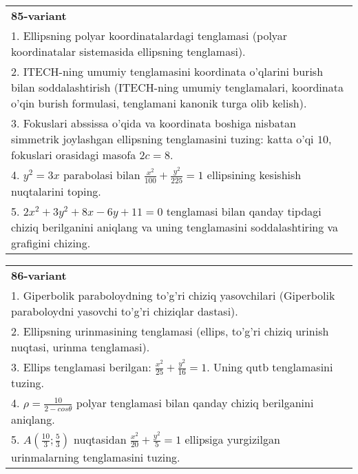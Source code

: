 \documentclass{article}
\begin{document}
\begin{tabular}{m{17cm}}
\textbf{85-variant}\\
1. Ellipsning polyar koordinatalardagi tenglamasi (polyar koordinatalar sistemasida ellipsning tenglamasi).\\

2. ITECH-ning umumiy tenglamasini koordinata o'qlarini burish bilan soddalashtirish (ITECH-ning umumiy tenglamalari, koordinata o'qin burish formulasi, tenglamani kanonik turga olib kelish).\\

3. Fokuslari abssissa o'qida va koordinata boshiga nisbatan simmetrik joylashgan ellipsning tenglamasini tuzing: katta o'qi $10$, fokuslari orasidagi masofa $2c=8$.\\

4. $y^{2} = 3x$ parabolasi bilan $\frac{x^{2}}{100} + \frac{y^{2}}{225} = 1$ ellipsining kesishish nuqtalarini toping.  \\

5. $2x^{2} + 3y^{2} + 8x - 6y + 11 = 0$ tenglamasi bilan qanday tipdagi chiziq berilganini aniqlang va uning tenglamasini soddalashtiring va grafigini chizing.  
\end{tabular}
\vspace{1cm}


\begin{tabular}{m{17cm}}
\textbf{86-variant}\\
1. Giperbolik paraboloydning to'g'ri chiziq yasovchilari (Giperbolik paraboloydni yasovchi to'g'ri chiziqlar dastasi).\\

2. Ellipsning urinmasining tenglamasi (ellips, to'g'ri chiziq urinish nuqtasi, urinma tenglamasi).\\

3. Ellips tenglamasi berilgan: $\frac{x^2}{25}+\frac{y^2}{16}=1$. Uning qutb tenglamasini tuzing.\\

4. $\rho = \frac{10}{2 - cos\theta}$ polyar tenglamasi bilan qanday chiziq berilganini aniqlang.  \\

5. $A(\frac{10}{3};\frac{5}{3})$ nuqtasidan $\frac{x^{2}}{20} + \frac{y^{2}}{5} = 1$ ellipsiga yurgizilgan urinmalarning tenglamasini tuzing.  
\end{tabular}
\vspace{1cm}
\end{document}
